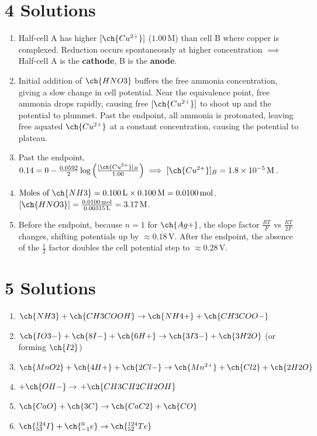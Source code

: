 \documentclass[11pt]{article}
\begin{document}
\section{4 Solutions}
\begin{enumerate}[label=\alph*.]
    \item Half-cell A has higher $[\ch{Cu^{2+}}]$ ($1.00\,\text{M}$) than cell B where copper is complexed. Reduction occurs spontaneously at higher concentration $\implies$ Half-cell A is the \textbf{cathode}, B is the \textbf{anode}.
    \item Initial addition of $\ch{HNO3}$ buffers the free ammonia concentration, giving a slow change in cell potential. Near the equivalence point, free ammonia drops rapidly, causing free $[\ch{Cu^{2+}}]$ to shoot up and the potential to plummet. Past the endpoint, all ammonia is protonated, leaving free aquated $\ch{Cu^{2+}}$ at a constant concentration, causing the potential to plateau.
    \item Past the endpoint, $0.14 = 0 - \frac{0.0592}{2}\log\left(\frac{[\ch{Cu^{2+}}]_B}{1.00}\right) \implies [\ch{Cu^{2+}}]_B = 1.8\times10^{-5}\,\text{M}$.
    \item $\text{Moles of }\ch{NH3} = 0.100\,\text{L} \times 0.100\,\text{M} = 0.0100\,\text{mol}$. $[\ch{HNO3}] = \frac{0.0100\,\text{mol}}{0.00315\,\text{L}} = 3.17\,\text{M}$.
    \item Before the endpoint, because $n=1$ for $\ch{Ag+}$, the slope factor $\frac{RT}{F}$ vs $\frac{RT}{2F}$ changes, shifting potentials up by $\approx 0.18\,\text{V}$. After the endpoint, the absence of the $\frac{1}{2}$ factor doubles the cell potential step to $\approx 0.28\,\text{V}$.
\end{enumerate}

\section{5 Solutions}
\begin{enumerate}[label=\alph*.]
    \item $\ch{NH3} + \ch{CH3COOH} \rightarrow \ch{NH4+} + \ch{CH3COO-}$
    \item $\ch{IO3-} + \ch{8I-} + \ch{6H+} \rightarrow \ch{3I3-} + \ch{3H2O}$ (or forming $\ch{I2}$)
    \item $\ch{MnO2} + \ch{4H+} + \ch{2Cl-} \rightarrow \ch{Mn^{2+}} + \ch{Cl2} + \ch{2H2O}$
    \item {} $+ \ch{OH-} \rightarrow$  $+ \ch{CH3CH2CH2OH}$
    \item $\ch{CaO} + \ch{3C} \rightarrow \ch{CaC2} + \ch{CO}$
    \item $\ch{^{124}_{53}I} + \ch{^0_{-1}e} \rightarrow \ch{^{124}_{52}Te}$
\end{enumerate}
\end{document}
